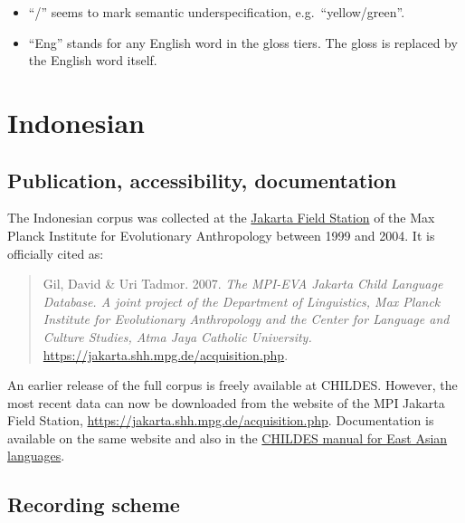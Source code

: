 \documentclass[a4paper, 11pt]{book}
\begin{document}
\begin{itemize}
	\item “/” seems to mark semantic underspecification, e.g.\ “yellow/green”. %
	\item “Eng” stands for any English word in the gloss tiers. The gloss is replaced by the English word itself. 
\end{itemize}


\section{Indonesian}
\label{sec:Indonesian}

\subsection{Publication, accessibility, documentation}
The Indonesian corpus \citep{Gil_etal2007a} was collected at the \href{http://lingweb.eva.mpg.de/jakarta/acquisition.php}{Jakarta Field Station} of the Max Planck Institute for Evolutionary Anthropology between 1999 and 2004. It is officially cited as:

\begin{quote}
Gil, David \& Uri Tadmor. 2007. \emph{The MPI-EVA Jakarta Child Language Database. A joint project of the Department of Linguistics, Max Planck Institute for Evolutionary Anthropology and the Center for Language and Culture Studies, Atma Jaya Catholic University.} \url{https://jakarta.shh.mpg.de/acquisition.php}.
\end{quote}	

An earlier release of the full corpus is freely available at CHILDES. However, the most recent data can now be downloaded from the website of the MPI Jakarta Field Station, \url{https://jakarta.shh.mpg.de/acquisition.php}. Documentation is available on the same website and also in the \href{http://childes.psy.cmu.edu/manuals/10eastasian.pdf}{CHILDES manual for East Asian languages}. 

\subsection{Recording scheme}
\end{document}
